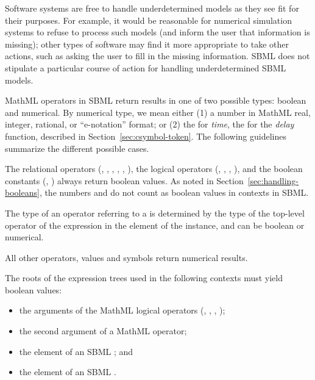 \begin{blockChanged}
Software systems are free to handle underdetermined models as they see fit for their purposes.  For example, it would be reasonable for numerical simulation systems to refuse to process such models (and inform the user that information is missing); other types of software may find it more appropriate to take other actions, such as asking the user to fill in the missing information.  SBML \thisLV does not stipulate a particular course of action for handling underdetermined SBML models.

\end{blockChanged}

\label{sec:mathmltype}

MathML operators in SBML return results in one of two
possible types: boolean and numerical.  By numerical type,
we mean either (1) a number in MathML real, integer, rational, or
``e-notation'' format; or (2) the  for \emph{time},
the  for the \emph{delay} function,  described in
Section~\ref{sec:csymbol-token}.  The following guidelines
summarize the different possible cases.

The relational operators (, , ,
, , ), the logical operators
(, , , ), and the
boolean constants (, ) always return
boolean values.  As noted in
  Section~\ref{sec:handling-booleans}, the numbers  and
   do not count as boolean values in \mathml
  contexts in SBML.

The type of an operator referring to a \FunctionDefinition is
determined by the type of the top-level operator of the expression
in the  element of the \FunctionDefinition
instance, and can be boolean or numerical.

All other operators, values and symbols return numerical
results.

The roots of the expression trees used in the following contexts
must yield boolean values:

\begin{itemize}\setlength{\parskip}{-0.2ex}

\item the arguments of the MathML logical operators (,
, , );

\item the second argument of a MathML  operator;

\item the  element of an SBML \Event; and

\item the  element of an SBML \Constraint.

\end{itemize}

